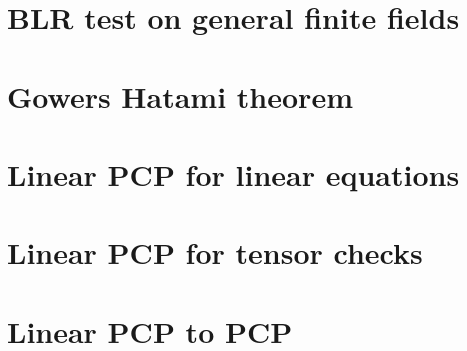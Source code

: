 %
\chapter{BLR test on general finite fields}


\chapter{Gowers Hatami theorem}
\chapter{Linear PCP for linear equations}
\chapter{Linear PCP for tensor checks}
\chapter{Linear PCP to PCP}
